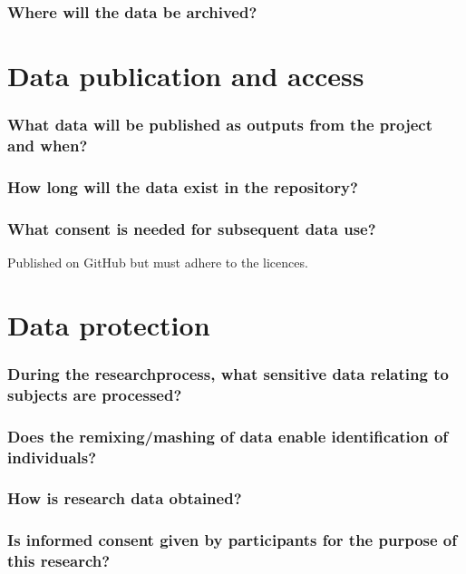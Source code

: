 \documentclass[a4paper]{article}
\begin{document}
\subsubsection{Where will the data be archived?}

\section{Data publication and access}

\subsubsection{What data will be published as outputs from the project and when?}

\subsubsection{How long will the data exist in the repository?}

\subsubsection{What consent is needed for subsequent data use?}

Published on GitHub but must adhere to the licences.

\section{Data protection}

\subsubsection{During the researchprocess, what sensitive data relating to subjects are processed?}

\subsubsection{Does the remixing/mashing of data enable identification of individuals?}

\subsubsection{How is research data obtained?}

\subsubsection{Is informed consent given by participants for the purpose of this research?}
\end{document}
